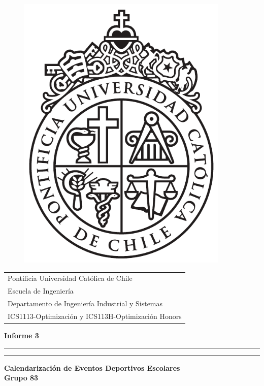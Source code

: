 \documentclass[12pt, letterpaper]{article}
\begin{document}
\begin{minipage}[t]{.13\textwidth}
	\vspace{-0.25in}
	\begin{figure}[H]
	\includegraphics[width=0.90\textwidth]{logo.pdf}
	\end{figure}
\end{minipage}
\hfill
\begin{minipage}[t]{.85\textwidth}
    \vspace{0pt}
    \begin{flushleft}
      \begin{tabular}{l}
	{\sc Pontificia Universidad Cat\'olica de Chile}\\
  	{\sc Escuela de Ingenier\'ia}\\
  	{\sc Departamento de Ingenier\'ia Industrial y Sistemas}\\
 	 {\sc ICS1113-Optimizaci\'on y ICS113H-Optimizaci\'on Honors}
 \end{tabular}
	\end{flushleft}
\end{minipage}
\vspace{0pt}
\hfill
\vspace*{6cm}
\begin{center}{}
\vspace*{2mm}
{\Huge\bf Informe 3}\\
\vspace*{4mm}
\hrule\vspace*{1pt}\hrule
\vspace*{4mm}
{\LARGE\bf Calendarización de Eventos Deportivos Escolares}\\
\vspace*{4mm}
{\huge\bf Grupo 83 }\\
\vspace*{1mm}
\end{center}
\end{document}
